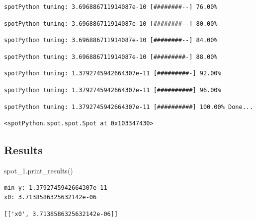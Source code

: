 \documentclass[
  letterpaper,
  DIV=11,
  numbers=noendperiod]{scrreprt}
\newenvironment{Shaded}{\begin{snugshade}}{\end{snugshade}}
\newcommand{\NormalTok}[1]{\textcolor[rgb]{0.00,0.23,0.31}{#1}}
\begin{document}
\begin{verbatim}
spotPython tuning: 3.696886711914087e-10 [########--] 76.00% 
\end{verbatim}

\begin{verbatim}
spotPython tuning: 3.696886711914087e-10 [########--] 80.00% 
\end{verbatim}

\begin{verbatim}
spotPython tuning: 3.696886711914087e-10 [########--] 84.00% 
\end{verbatim}

\begin{verbatim}
spotPython tuning: 3.696886711914087e-10 [#########-] 88.00% 
\end{verbatim}

\begin{verbatim}
spotPython tuning: 1.3792745942664307e-11 [#########-] 92.00% 
\end{verbatim}

\begin{verbatim}
spotPython tuning: 1.3792745942664307e-11 [##########] 96.00% 
\end{verbatim}

\begin{verbatim}
spotPython tuning: 1.3792745942664307e-11 [##########] 100.00% Done...
\end{verbatim}

\begin{verbatim}
<spotPython.spot.spot.Spot at 0x103347430>
\end{verbatim}

\hypertarget{results-3}{%
\subsection{Results}\label{results-3}}

\begin{Shaded}
\begin{Highlighting}[]
\NormalTok{spot\_1.print\_results()}
\end{Highlighting}
\end{Shaded}

\begin{verbatim}
min y: 1.3792745942664307e-11
x0: 3.7138586325632142e-06
\end{verbatim}

\begin{verbatim}
[['x0', 3.7138586325632142e-06]]
\end{verbatim}
\end{document}
